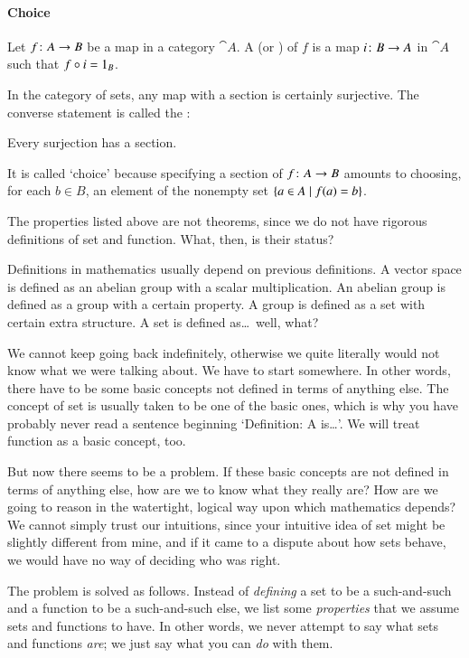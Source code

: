 \paragraph*{Choice}  Let $f\from A \to B$ be a map in a category $\cat{A}$.  A
%
%
%
(or ) of $f$ is a map $i\from B \to A$ in $\cat{A}$ such that $f \mathbin{\circ} i
= 1_B$.

In the category of sets, any map with a section is certainly surjective.  The
converse statement is called the :
%
\begin{setprop}
Every surjection has a section.
\end{setprop}
%
It is called `choice' because specifying a section of $f\from A \to B$ amounts
to choosing, for each $b \in B$, an element of the nonempty set $\{ a \in A
\mathrel{|} f(a) = b\}$.

\subjectchange

%
%
%
%
The properties listed above are not theorems, since we do not have rigorous
definitions of set and function.  What, then, is their status?

Definitions in mathematics usually depend on previous definitions.  A
vector space is defined as an abelian group with a scalar multiplication.
An abelian group is defined as a group with a certain property.  A group is
defined as a set with certain extra structure.  A set is defined as\ldots\
well, what?

We cannot keep going back indefinitely, otherwise we quite literally would not
know what we were talking about.  We have to start somewhere.  In other words,
there have to be some basic concepts not defined in terms of anything else.
The concept of set is usually taken to be one of the basic ones, which is
why you have probably never read a sentence beginning `Definition: A 
is\ldots'.  We will treat function as a basic concept, too.

But now there seems to be a problem.  If these basic concepts are not
defined in terms of anything else, how are we to know what they really are?
How are we going to reason in the watertight, logical way upon which
mathematics depends?  We cannot simply trust our intuitions, since your
intuitive idea of set might be slightly different from mine, and if it came
to a dispute about how sets behave, we would have no way of deciding who
was right.

The problem is solved as follows.  Instead of \emph{defining} a set to be a
such-and-such and a function to be a such-and-such else, we list some
\emph{properties} that we assume sets and functions to have.  In other words,
we never attempt to say what sets and functions \emph{are}; we just say what
you can \emph{do} with them.

